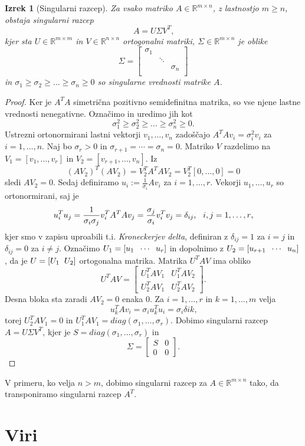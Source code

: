 \documentclass[mat1]{article}
\newtheorem{izrek}{Izrek}
\theoremstyle{definition}
\begin{document}
\begin{izrek}[Singularni razcep]
\label{izrek:SVD} Za vsako matriko $A \in \mathbb{R}^{m \times n}$, z lastnostjo $m \geq n$, obstaja singularni razcep 
$$A = U \Sigma V^T \text{,}$$
kjer sta $U \in \mathbb{R}^{m \times m}$ in $V \in \mathbb{R}^{n \times n}$ ortogonalni matriki, $\Sigma \in \mathbb{R}^{m \times n}$ je oblike
$$
\Sigma = 
\begin{bmatrix} 
\sigma_1 &  & \\
 & \ddots & \\
 & & \sigma_n  \\
 & & 
\end{bmatrix}$$
in $\sigma_1 \geq \sigma_2 \geq \ldots \geq \sigma_n \geq 0$ so singularne vrednosti matrike $A$.
\end{izrek}
\begin{proof}
Ker je $A^TA$ simetrična pozitivno semidefinitna matrika, so vse njene lastne vrednosti nenegativne. Označimo in uredimo jih kot
$$\sigma_1^2 \geq \sigma_2^2 \geq \ldots \geq \sigma_n^2 \geq 0 \text{.}$$
Ustrezni ortonormirani lastni vektorji $v_1, \ldots, v_n$ zadoščajo
$A^T A v_i = \sigma_i^2 v_i$ za $i = 1, \ldots, n \text{.}$
Naj bo $\sigma_r > 0$ in $\sigma_{r+1} = \cdots = \sigma_n = 0 \text{.}$
Matriko $V$ razdelimo na $V_1 = 
\left[ v_1, \ldots, v_r
\right]$ in $V_2 = 
\left[ v_{r+1}, \ldots, v_n
\right] \text{.}$ Iz
$$ (AV_2)^T (AV_2) = V_2^T A^T A V_2 = V_2^T \left[ 0, \ldots, 0 \right] = 0
$$
sledi $AV_2 = 0 \text{.}$ Sedaj definiramo $u_i := \frac{1}{\sigma_i} Av_i$ za $i = 1, \ldots, r \text{.}$
Vekorji $u_1, \ldots, u_r$ so ortonormirani, saj je
$$ u_i^T u_j = \frac{1}{\sigma_i \sigma_j} v_i^T A^T A v_j = \frac{\sigma_j}{\sigma_i} v_i^T v_j = \delta_{ij} \text{,} \hspace{3mm} i,j = 1, \ldots, r \text{,}
$$
kjer smo v zapisu uproabili t.i. \emph{Kroneckerjev delta}, definiran z $\delta_{ij} = 1$ za $i = j$ in $\delta_{ij} = 0$ za $i \neq j$. Označimo 
$U_1 = 
\left[ u_1 \hspace{2mm} \cdots \hspace{2mm} u_r
\right]$ in dopolnimo z $U_2 = 
\left[ u_{r+1} \hspace{2mm} \cdots \hspace{2mm} u_n
\right]$, da je $ U = \left[ U_1 \hspace{2mm} U_2 \right]$ ortogonalna matrika. Matrika $U^T A V$ ima obliko 
$$
U^T A V = 
\begin{bmatrix} 
U_1^T A V_1 & U_1^T A V_2 \\
U_2^T A V_1 & U_2^T A V_2
\end{bmatrix}
\text{.}
$$
Desna bloka sta zaradi $AV_2 = 0$ enaka $0$. Za $i = 1, \ldots, r$ in $k = 1, \ldots, m$ velja
$$ u_k^T A v_i = \sigma_i u_k^T u_i = \sigma_i \delta{ik} \text{,}
$$
torej $U_2^T A V_1 = 0$ in $U_1^T A V_1 = diag(\sigma_1, \ldots, \sigma_r) \text{.}$ Dobimo singularni razcep $A = U \Sigma V^T \text{,}$ kjer je $S = diag(\sigma_1, \ldots, \sigma_r)$ in 
$$ \Sigma = 
\begin{bmatrix} 
S & 0 \\
0 & 0
\end{bmatrix}
\text{.}$$

\end{proof}
V primeru, ko velja $n>m$, dobimo singularni razcep za $A \in \mathbb{R}^{m \times n}$ tako, da transponiramo singularni razcep $A^T$.
\section{Viri}
\end{document}
